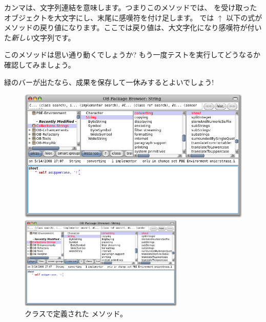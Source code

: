 \documentclass[a4paper,10pt,twoside]{book}
\begin{document}
カンマは、文字列連結を意味します。つまりこのメソッドでは、 を受け取った  オブジェクトを大文字にし、末尾に感嘆符を付け足します。
\pharo では $\uparrow$ 以下の式がメソッドの戻り値になります。ここでは戻り値は、大文字化になり感嘆符が付いた\emph{新しい}文字列です。

このメソッドは思い通り動くでしょうか? もう一度テストを実行してどうなるか確認してみましょう。

緑のバーが出たなら、成果を保存して一休みするとよいでしょう!

\begin{figure}[hbt]
\ifluluelse
	{\centerline{\includegraphics[width=\textwidth]{String-Shout}}}
	{\centerline{\includegraphics[width=0.7\textwidth]{String-Shout}}}
\caption{ クラスで定義された  メソッド。
}
\end{figure}
\end{document}
